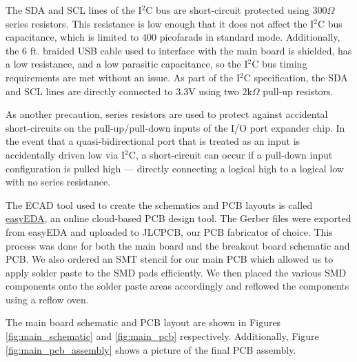 \documentclass[conference]{IEEEtran}
\begin{document}
The SDA and SCL lines of the I$^2$C bus are short-circuit protected using $300 \Omega$ series resistors. This resistance is low enough that it does not affect the I$^2$C bus capacitance, which is limited to $400$ picofarads in standard mode. Additionally, the 6 ft. braided USB cable used to interface with the main board is shielded, has a low resistance, and a low parasitic capacitance, so the I$^2$C bus timing requirements are met without an issue. As part of the I$^2$C specification, the SDA and SCL lines are directly connected to 3.3V using two $2 \text{k}\Omega$ pull-up resistors.

As another precaution, series resistors are used to protect against accidental short-circuits on the pull-up/pull-down inputs of the I/O port expander chip. In the event that a quasi-bidirectional port that is treated as an input is accidentally driven low via I$^2$C, a short-circuit can occur if a pull-down input configuration is pulled high --- directly connecting a logical high to a logical low with no series resistance.

The ECAD tool used to create the schematics and PCB layouts is called \href{https://easyeda.com}{easyEDA}, an online cloud-based PCB design tool. The Gerber files were exported from easyEDA and uploaded to JLCPCB, our PCB fabricator of choice. This process was done for both the main board and the breakout board schematic and PCB. We also ordered an SMT stencil for our main PCB which allowed us to apply solder paste to the SMD pads efficiently. We then placed the various SMD components onto the solder paste areas accordingly and reflowed the components using a reflow oven.

The main board schematic and PCB layout are shown in Figures \ref{fig:main_schematic} and \ref{fig:main_pcb} respectively. Additionally, Figure \ref{fig:main_pcb_assembly} shows a picture of the final PCB assembly.
\end{document}
